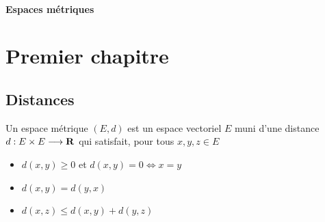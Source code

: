 \ifsolo
    ~

    \vspace{1cm}

    \begin{center}
        \textbf{\LARGE Espaces métriques} \\[1em]
    \end{center}
    \tableofcontents
\else
    \chapter{Premier chapitre}

    \minitoc
\fi
\thispagestyle{empty}

\section{Distances}

\begin{dfn}
    Un espace métrique $(E, d)$ est un espace vectoriel $E$ muni d'une distance $d:E\times E \longrightarrow  \mathbf R$ qui satisfait, pour tous $x,y,z \in  E$
    \begin{itemize}
        \item $d(x, y)\geq 0$ et $d(x, y)=0 \iff  x=y$
        \item $d(x, y)=d(y, x)$
        \item  $d(x, z)\leq d(x, y)+d(y, z)$
    \end{itemize}
\end{dfn}


